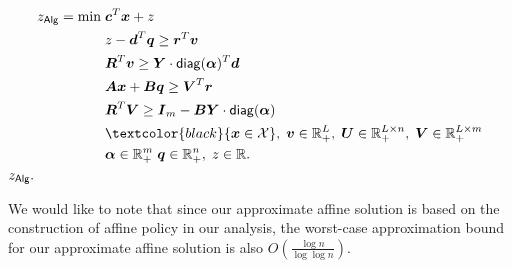 \documentclass[moor]{informs1}              %
\newcommand{\mb}[1]{\ensuremath{\boldsymbol{#1}}}
\newcommand*{\red}{\textcolor{black}}
\begin{document}
{\begin{algorithm}[H]
\begin{algorithmic}[1]
\begin{equation*}
\begin{aligned}
z_{\sf Alg}= \min \; &  \mb{c}^T \mb{x} + z \\
& z- \mb d^T \mb q \geq \mb r^T \mb v \\
& \mb R^T \mb v \geq \mb Y \cdot {\sf diag}  ( \mb {\alpha} )^T \mb d \\
& \mb A \mb x + \mb B \mb q \geq \mb V^T \mb r\\
& \mb R^T \mb V \geq \mb I_m - \mb B \mb Y \cdot {\sf diag}  ( \mb {\alpha} ) \\
& \red{\mb{x}  \in  {\cal X} }, \; \mb{v}   \in  {\mathbb R}^{L}_+, \; \mb{U}   \in  {\mathbb R}^{L \times n}_+, \; \mb{V}   \in  {\mathbb R}^{L \times m}_+ \\
&  \mb{\alpha}   \in  {\mathbb R}^{m}_+ \; \mb q \in \mathbb{R}_+^n, \; z \in \mathbb{R}.   \\
\end{aligned}
\end{equation*}
\State \Return $z_{\sf Alg}.$
\end{algorithmic}
\end{algorithm}
We would like to note that since our approximate affine solution is based on the construction of affine policy in our analysis, the worst-case approximation bound for our approximate affine solution  is also $O (  \frac{\log n}{\log \log n} )$.
}
\end{document}
